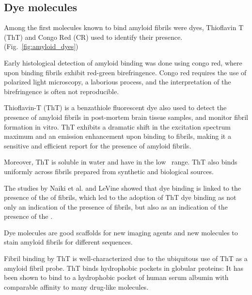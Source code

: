 \subsection{Dye molecules}


Among the first molecules known to bind amyloid fibrils were dyes, Thioflavin T (ThT) and Congo Red (CR) used to identify their presence.(Fig.~\ref{fig:amyloid_dyes})

Early histological detection of amyloid binding was done using congo red, where upon binding fibrils exhibit red-green birefringence. Congo red requires the use of polarized light microscopy, a laborious process, and the interpretation of the birefringence is often not reproducible.

Thioflavin-T (ThT) is a benzathiole fluorescent dye also used to detect the presence of amyloid fibrils in post-mortem brain tissue samples, and monitor fibril formation in vitro. ThT exhibits a dramatic shift in the excitation spectrum maximum and an emission enhancement upon binding to fibrils, making it a sensitive and efficient report for the presence of amyloid fibrils.

Moreover, ThT is soluble in water and have \KD in the low \micromolar\ range.  ThT also binds uniformly across fibrils prepared from synthetic and biological sources.

The studies by Naiki et al. and LeVine showed that dye binding is linked to the presence of the \crossbs of fibrils, which led to the adoption of ThT dye binding as not only an indication of the presence of fibrils, but also as an indication of the presence of the \crossbs.

Dye molecules are good scaffolds for new imaging agents and new molecules to stain amyloid fibrils for different sequences.

Fibril binding by ThT is well-characterized due to the ubiquitous use of ThT as a amyloid fibril probe.
ThT binds hydrophobic pockets in globular proteins: It has been shown to bind to a hydrophobic pocket of human serum albumin with comparable affinity to many drug-like molecules.\cite{Groenning:2007p3436,Groenning:2007eo}

